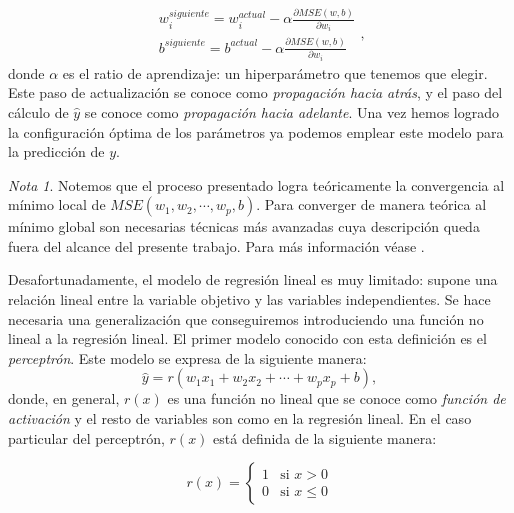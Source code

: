 \documentclass[12pt, a4paper, twoside]{book}
\numberwithin{equation}{section}
\theoremstyle{definition}
\theoremstyle{remark}
\newtheorem*{remark}{Nota}
\theoremstyle{plain}
\begin{document}
	\begin{equation*}
	\begin{array}{c}
		w_{i}^{siguiente}=w_{i}^{actual}-\alpha\frac{\partial MSE(w,b)}
		{\partial w_{i}}\\
		b^{siguiente}=b^{actual}-\alpha\frac{\partial MSE(w,b)}
		{\partial w_{i}}
	\end{array},
	\end{equation*}
	donde $\alpha$ es el ratio de aprendizaje: un hiperparámetro que 
	tenemos que elegir. Este paso de actualización se conoce como 
	\emph{propagación hacia atrás}, y el paso del cálculo de $\hat{y}$ se 
	conoce como \emph{propagación hacia adelante}. Una vez hemos logrado 
	la 
	configuración óptima de los parámetros ya podemos emplear este modelo 
	para la predicción de $y$.
	
	\begin{remark}
	Notemos que el proceso presentado logra teóricamente la convergencia 
	al mínimo local de $MSE(w_{1},w_{2},\cdots,w_{p},b)$. Para converger de 
	manera teórica al 
	mínimo global son necesarias técnicas más avanzadas cuya descripción 
	queda fuera del alcance del presente trabajo. Para más información 
	véase \cite{Goodfellow-et-al-2016}.
	\end{remark}

	Desafortunadamente, el modelo de regresión lineal es muy limitado: 
	supone una relación lineal entre la variable objetivo y las variables
	independientes. Se hace necesaria una generalización que conseguiremos
	introduciendo una función no lineal a la regresión lineal. El primer
	modelo conocido con esta definición es el \emph{perceptrón}. Este 
	modelo se expresa de la siguiente manera:
	\begin{equation*}
		\hat{y}=r(w_{1}x_{1}+w_{2}x_{2}+\cdots+w_{p}x_{p}+b),
	\end{equation*}
	donde, en general, $r(x)$ es una función no lineal que se conoce como 
	\emph{función de activación} y el resto de variables son como en la 
	regresión lineal. En el caso particular del perceptrón, $r(x)$ está 
	definida de la siguiente manera:
	
	\begin{equation}
		\label{def:r}
		r(x)=\left \{
			\begin{array}{ll}
				1&\text{si }x>0\\
				0&\text{si }x\leq0
			\end{array} 
		     \right .
	\end{equation}
\end{document}
